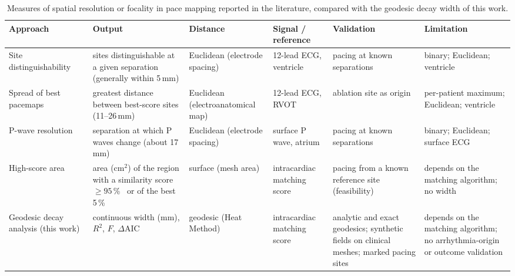 \documentclass[a4paper,fleqn]{cas-dc}
\begin{document}
\begin{table}[t]
  \centering
  \caption{Measures of spatial resolution or focality in pace mapping reported in the literature, compared with the geodesic decay width of this work.}  %
  \label{tab:comparison}
  \small\setlength{\tabcolsep}{4pt}
  \begin{tabular}{L{3.0cm}L{2.6cm}L{2.0cm}L{2.2cm}L{2.4cm}L{3.1cm}}
    \toprule
    Approach & Output & Distance & Signal / reference & Validation & Limitation \\
    \midrule
    Site distinguishability~\citep{kadish1991} & sites distinguishable at a given separation (generally within 5\,mm) & Euclidean (electrode spacing) & 12-lead ECG, ventricle & pacing at known separations & binary; Euclidean; ventricle \\
    Spread of best pacemaps~\citep{azegami2005} & greatest distance between best-score sites (11--26\,mm) & Euclidean (electroanatomical map) & 12-lead ECG, RVOT & ablation site as origin & per-patient maximum; Euclidean; ventricle \\
    P-wave resolution~\citep{man1996} & separation at which P waves change (about 17\,mm) & Euclidean (electrode spacing) & surface P wave, atrium & pacing at known separations & binary; Euclidean; surface ECG \\
    High-score area~\citep{lyan2024, willert2024} & area (cm$^2$) of the region with a similarity score $\ge 95$\,\%~\citep{willert2024} or of the best 5\,\%~\citep{lyan2024} & surface (mesh area) & intracardiac matching score & pacing from a known reference site (feasibility) & depends on the matching algorithm; no width \\
    Geodesic decay analysis (this work) & continuous width (mm), $R^2$, $F$, $\Delta\mathrm{AIC}$ & geodesic (Heat Method) & intracardiac matching score & analytic and exact geodesics; synthetic fields on clinical meshes; marked pacing sites & depends on the matching algorithm; no arrhythmia-origin or outcome validation \\
    \bottomrule
  \end{tabular}
\end{table}
\end{document}
